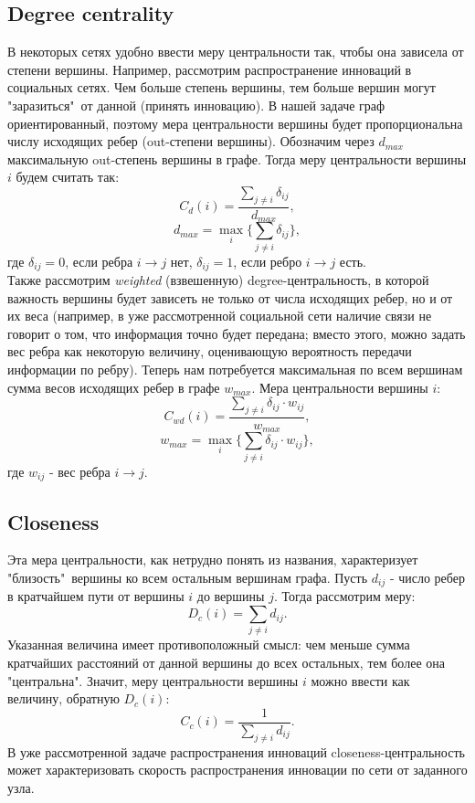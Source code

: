 \subsection{Degree centrality}
В некоторых сетях удобно ввести меру центральности так, чтобы она зависела от степени вершины. Например, рассмотрим распространение инноваций в социальных сетях. Чем больше степень вершины, тем больше вершин могут "заразиться"\ от данной (принять инновацию). В нашей задаче граф ориентированный, поэтому мера центральности вершины будет пропорциональна числу исходящих ребер (out-степени вершины). Обозначим через $d_{max}$ максимальную out-степень вершины в графе. Тогда меру центральности вершины $i$ будем считать так:
	\begin{equation}
	C_d(i) = \frac{\sum_{j\neq i} \delta_{ij}}{d_{max}},
	\end{equation}
	\begin{equation}
	d_{max} = \max_i\{\sum_{j\neq i}\delta_{ij}\},
	\end{equation}
	где $\delta_{ij}=0$, если ребра $i\rightarrow j$ нет, $\delta_{ij}=1$, если ребро $i \rightarrow j$ есть.\\
	
	Также рассмотрим \textit{weighted} (взвешенную) degree-центральность, в которой важность вершины будет зависеть не только от числа исходящих ребер, но и от их веса (например, в уже рассмотренной социальной сети наличие связи не говорит о том, что информация точно будет передана; вместо этого, можно задать вес ребра как некоторую величину, оценивающую вероятность передачи информации по ребру). Теперь нам потребуется максимальная по всем вершинам сумма весов исходящих ребер в графе $w_{max}$. Мера центральности вершины $i$:
	\begin{equation}
	C_{wd}(i) = \frac{\sum_{j\neq i} \delta_{ij}\cdot w_{ij}}{w_{max}},
	\end{equation}
	\begin{equation}
	w_{max} = \max_i\{\sum_{j\neq i}\delta_{ij}\cdot w_{ij}\},
	\end{equation}
	где $w_{ij}$ - вес ребра $i \rightarrow j$.
	
	\subsection{Closeness}
	Эта мера центральности, как нетрудно понять из названия, характеризует "близость"\ вершины ко всем остальным вершинам графа. Пусть $d_{ij}$ - число ребер в кратчайшем пути от вершины $i$ до вершины $j$. Тогда рассмотрим меру:
	\begin{equation}
	D_c(i)=\sum_{j\neq i} d_{ij}.
	\end{equation}
	Указанная величина имеет противоположный смысл: чем меньше сумма кратчайших расстояний от данной вершины до всех остальных, тем более она "центральна". Значит, меру центральности вершины $i$ можно ввести как величину, обратную $D_c(i)$:
	\begin{equation}
	C_c(i) = \frac{1}{\sum_{j\neq i} d_{ij}}.
	\end{equation}
	В уже рассмотренной задаче распространения инноваций closeness-центральность может характеризовать скорость распространения инновации по сети от заданного узла.
	
